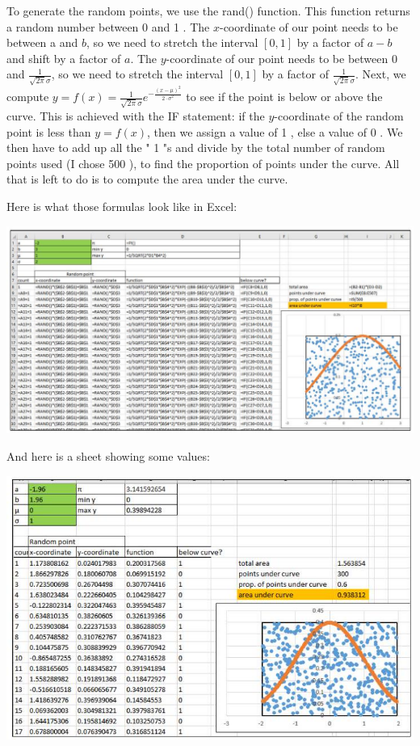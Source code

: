 \documentclass[10pt]{article}
\begin{document}
To generate the random points, we use the rand() function. This function returns a random number between 0 and 1 . The $x$-coordinate of our point needs to be between a and $b$, so we need to stretch the interval $[0,1]$ by a factor of $a-b$ and shift by a factor of $a$. The $y$-coordinate of our point needs to be between 0 and $\frac{1}{\sqrt{2 \pi} \sigma}$, so we need to stretch the interval $[0,1]$ by a factor of $\frac{1}{\sqrt{2 \pi} \sigma}$. Next, we compute $y=f(x)=\frac{1}{\sqrt{2 \pi} \sigma} e^{-\frac{(x-\mu)^{2}}{2 \cdot \sigma^{2}}}$ to see if the point is below or above the curve. This is achieved with the IF statement: if the $y$-coordinate of the random point is less than $y=f(x)$, then we assign a value of 1 , else a value of 0 . We then have to add up all the " 1 "s and divide by the total number of random points used (I chose 500 ), to find the proportion of points under the curve. All that is left to do is to compute the area under the curve.

Here is what those formulas look like in Excel:

\includegraphics[max width=\textwidth]{2022_07_05_5945264bba2a5f6ba667g-19}

And here is a sheet showing some values:

\includegraphics[max width=\textwidth]{2022_07_05_5945264bba2a5f6ba667g-20}
\end{document}
